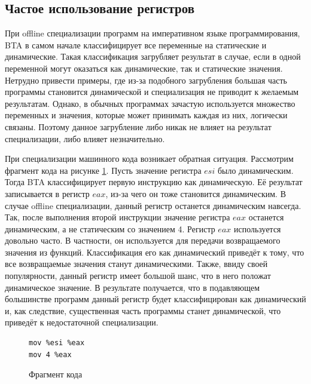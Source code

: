 \subsection{Частое использование регистров}
\label{part:4.1}
При offline специализации программ на императивном языке программирования, BTA в самом начале классифицирует все переменные на статические и динамические. Такая классификация загрубляет результат в случае, если в одной переменной могут оказаться как динамические, так и статические значения. Нетрудно привести примеры, где из-за подобного загрубления большая часть программы становится динамической и специализация не приводит к желаемым результатам. Однако, в обычных программах зачастую используется множество переменных и значения, которые может принимать каждая из них, логически связаны. Поэтому данное загрубление либо никак не влияет на результат специализации, либо влияет незначительно.

При специализации машинного кода возникает обратная ситуация. Рассмотрим фрагмент кода на рисунке \ref{fig:reg}. Пусть значение регистра $esi$ было динамическим. Тогда BTA классифицирует первую инструкцию как динамическую. Её результат записывается в регистр $eax$, из-за чего он тоже становится динамическим. В случае offline специализации, данный регистр останется динамическим навсегда. Так, после выполнения второй инструкции значение регистра $eax$ останется динамическим, а не статическим со значением 4. Регистр $eax$ используется довольно часто. В частности, он используется для передачи возвращаемого значения из функций. Классификация его как динамический приведёт к тому, что все возвращаемые значения станут динамическими. Также, ввиду своей популярности, данный регистр имеет большой шанс, что в него положат динамическое значение. В результате получается, что в подавляющем большинстве программ данный регистр будет классифицирован как динамический и, как следствие, существенная часть программы станет динамической, что приведёт к недостаточной специализации.

\begin{figure}
\begin{lstlisting}[xleftmargin = 20pt]
mov %esi %eax
mov 4 %eax
\end{lstlisting}
\caption{Фрагмент кода}
\label{fig:reg}
\end{figure}

